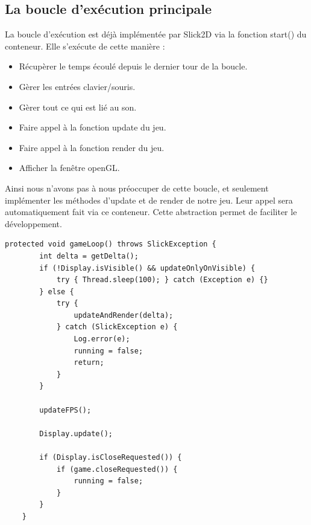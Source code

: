 \documentclass{report}
\begin{document}
\subsection{La boucle d'exécution principale}
La boucle d'exécution est déjà implémentée par Slick2D via la fonction start() du conteneur. Elle s'exécute de cette manière :
\begin{itemize}
\item Récupèrer le temps écoulé depuis le dernier tour de la boucle.
\item Gèrer les entrées clavier/souris.
\item Gèrer tout ce qui est lié au son.
\item Faire appel à la fonction update du jeu.
\item Faire appel à la fonction render du jeu.
\item Afficher la fenêtre openGL.
\end{itemize}
Ainsi nous n'avons pas à nous préoccuper de cette boucle, et seulement implémenter les méthodes d'update et de render de notre jeu. Leur appel sera automatiquement fait via ce conteneur. Cette abstraction permet de faciliter le développement.
\begin{lstlisting}[caption=La boucle principale : GameLoop()]
protected void gameLoop() throws SlickException {
		int delta = getDelta();
		if (!Display.isVisible() && updateOnlyOnVisible) {
			try { Thread.sleep(100); } catch (Exception e) {}
		} else {
			try {
				updateAndRender(delta);
			} catch (SlickException e) {
				Log.error(e);
				running = false;
				return;
			}
		}

		updateFPS();

		Display.update();
		
		if (Display.isCloseRequested()) {
			if (game.closeRequested()) {
				running = false;
			}
		}
	}
\end{lstlisting}
\end{document}
